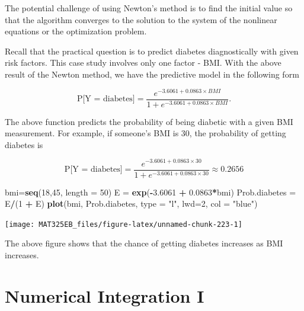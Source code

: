 \documentclass[
]{book}
\newenvironment{Shaded}{\begin{snugshade}}{\end{snugshade}}
\newcommand{\AttributeTok}[1]{\textcolor[rgb]{0.13,0.29,0.53}{#1}}
\newcommand{\DecValTok}[1]{\textcolor[rgb]{0.00,0.00,0.81}{#1}}
\newcommand{\FloatTok}[1]{\textcolor[rgb]{0.00,0.00,0.81}{#1}}
\newcommand{\FunctionTok}[1]{\textcolor[rgb]{0.13,0.29,0.53}{\textbf{#1}}}
\newcommand{\NormalTok}[1]{#1}
\newcommand{\OtherTok}[1]{\textcolor[rgb]{0.56,0.35,0.01}{#1}}
\newcommand{\SpecialCharTok}[1]{\textcolor[rgb]{0.81,0.36,0.00}{\textbf{#1}}}
\newcommand{\StringTok}[1]{\textcolor[rgb]{0.31,0.60,0.02}{#1}}
\begin{document}
The potential challenge of using Newton's method is to find the initial value so that the algorithm converges to the solution to the system of the nonlinear equations or the optimization problem.

Recall that the practical question is to predict diabetes diagnostically with given risk factors. This case study involves only one factor - BMI. With the above result of the Newton method, we have the predictive model in the following form

\[
\text{P[Y = diabetes]} = \frac{e^{-3.6061 + 0.0863\times BMI}}{1 + e^{-3.6061 + 0.0863\times BMI}}.
\]

The above function predicts the probability of being diabetic with a given BMI measurement. For example, if someone's BMI is 30, the probability of getting diabetes is

\[
\text{P[Y = diabetes]} = \frac{e^{-3.6061 + 0.0863\times 30}}{1 + e^{-3.6061 + 0.0863\times 30}} \approx 0.2656
\]

\begin{Shaded}
\begin{Highlighting}[]
\NormalTok{bmi}\OtherTok{=}\FunctionTok{seq}\NormalTok{(}\DecValTok{18}\NormalTok{,}\DecValTok{45}\NormalTok{, }\AttributeTok{length =} \DecValTok{50}\NormalTok{)}
\NormalTok{E }\OtherTok{=} \FunctionTok{exp}\NormalTok{(}\SpecialCharTok{{-}}\FloatTok{3.6061} \SpecialCharTok{+} \FloatTok{0.0863}\SpecialCharTok{*}\NormalTok{bmi)}
\NormalTok{Prob.diabetes }\OtherTok{=}\NormalTok{ E}\SpecialCharTok{/}\NormalTok{(}\DecValTok{1} \SpecialCharTok{+}\NormalTok{ E)}
\FunctionTok{plot}\NormalTok{(bmi, Prob.diabetes, }\AttributeTok{type =} \StringTok{"l"}\NormalTok{, }\AttributeTok{lwd=}\DecValTok{2}\NormalTok{, }\AttributeTok{col =} \StringTok{"blue"}\NormalTok{)}
\end{Highlighting}
\end{Shaded}

\begin{center}\texttt{[image: MAT325EB\_files/figure-latex/unnamed-chunk-223-1]} \end{center}

The above figure shows that the chance of getting diabetes increases as BMI increases.

\hypertarget{numerical-integration-i}{%
\chapter{Numerical Integration I}\label{numerical-integration-i}}
\end{document}
